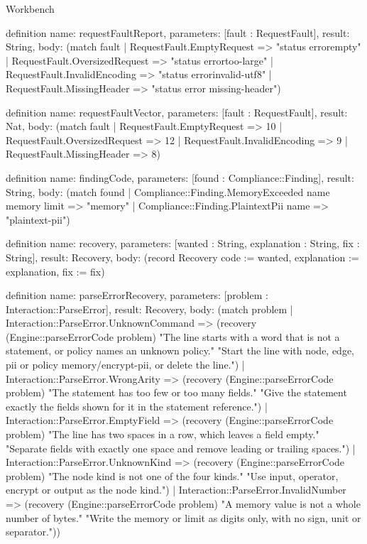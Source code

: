 \begin{lexlean}{Workbench}
\begin{semanticmodule}
definition{
  name: requestFaultReport,
  parameters: [fault : RequestFault],
  result: String,
  body: (match fault
    | RequestFault.EmptyRequest => "status error\nrequest empty"
    | RequestFault.OversizedRequest => "status error\nrequest too-large"
    | RequestFault.InvalidEncoding => "status error\nrequest invalid-utf8"
    | RequestFault.MissingHeader => "status error missing-header")
}

definition{
  name: requestFaultVector,
  parameters: [fault : RequestFault],
  result: Nat,
  body: (match fault
    | RequestFault.EmptyRequest => 10
    | RequestFault.OversizedRequest => 12
    | RequestFault.InvalidEncoding => 9
    | RequestFault.MissingHeader => 8)
}

definition{
  name: findingCode,
  parameters: [found : Compliance::Finding],
  result: String,
  body: (match found
    | Compliance::Finding.MemoryExceeded name memory limit => "memory"
    | Compliance::Finding.PlaintextPii name => "plaintext-pii")
}

definition{
  name: recovery,
  parameters: [wanted : String, explanation : String, fix : String],
  result: Recovery,
  body: (record Recovery {code := wanted, explanation := explanation, fix := fix})
}

definition{
  name: parseErrorRecovery,
  parameters: [problem : Interaction::ParseError],
  result: Recovery,
  body: (match problem
    | Interaction::ParseError.UnknownCommand => (recovery (Engine::parseErrorCode problem) "The line starts with a word that is not a statement, or policy names an unknown policy." "Start the line with node, edge, pii or policy memory/encrypt-pii, or delete the line.")
    | Interaction::ParseError.WrongArity => (recovery (Engine::parseErrorCode problem) "The statement has too few or too many fields." "Give the statement exactly the fields shown for it in the statement reference.")
    | Interaction::ParseError.EmptyField => (recovery (Engine::parseErrorCode problem) "The line has two spaces in a row, which leaves a field empty." "Separate fields with exactly one space and remove leading or trailing spaces.")
    | Interaction::ParseError.UnknownKind => (recovery (Engine::parseErrorCode problem) "The node kind is not one of the four kinds." "Use input, operator, encrypt or output as the node kind.")
    | Interaction::ParseError.InvalidNumber => (recovery (Engine::parseErrorCode problem) "A memory value is not a whole number of bytes." "Write the memory or limit as digits only, with no sign, unit or separator."))
}


\end{semanticmodule}
\end{lexlean}
